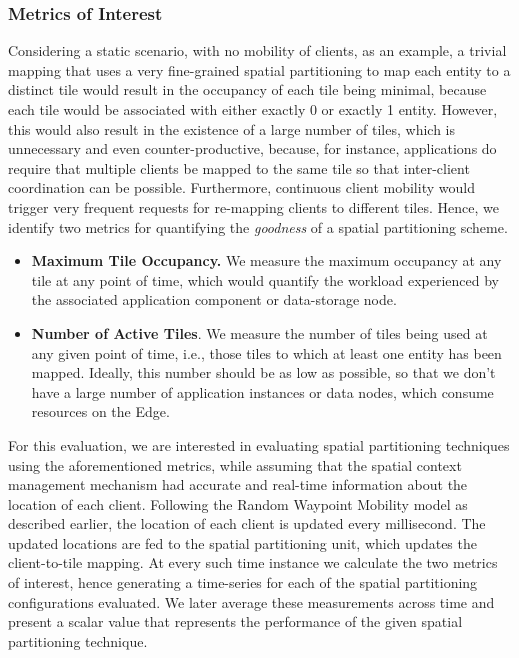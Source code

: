 \subsubsection{Metrics of Interest}
Considering a static scenario, with no mobility of clients, as an example, a trivial mapping that uses a very fine-grained spatial partitioning to map each entity to a distinct tile would result in the occupancy of each tile being minimal, because each tile would be associated with either exactly 0 or exactly 1 entity. However, this would also result in the existence of a large number of tiles, which is unnecessary and even counter-productive, because, for instance, applications do require that multiple clients be mapped to the same tile so that inter-client coordination can be possible. Furthermore, continuous client mobility would trigger very frequent requests for re-mapping clients to different tiles. Hence, we identify two metrics for quantifying the \textit{goodness} of a spatial partitioning scheme. 
\begin{itemize}
\item \textbf{Maximum Tile Occupancy.} We measure the maximum occupancy at any tile at any point of time, which would quantify the workload experienced by the associated application component or data-storage node. 
\item \textbf{Number of Active Tiles}. We measure the number of tiles being used at any given point of time, i.e., those tiles to which at least one entity has been mapped. Ideally, this number should be as low as possible, so that we don't have a large number of application instances or data nodes, which consume resources on the Edge.
\end{itemize}
\par For this evaluation, we are interested in evaluating spatial partitioning techniques using the aforementioned metrics, while assuming that the spatial context management mechanism had accurate and real-time information about the location of each client. Following the Random Waypoint Mobility model as described earlier, the location of each client is updated every millisecond. The updated locations are fed to the spatial partitioning unit, which updates the client-to-tile mapping. At every such time instance we calculate the two metrics of interest, hence generating a time-series for each of the spatial partitioning configurations evaluated. We later average these measurements across time and present a scalar value that represents the performance of the given spatial partitioning technique.

